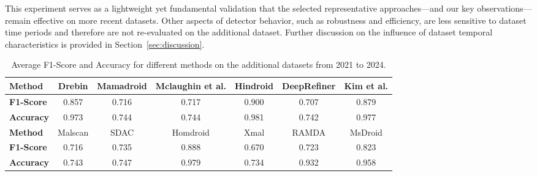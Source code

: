 This experiment serves as a lightweight yet fundamental validation that the selected representative approaches—and our key observations—remain effective on more recent datasets.
Other aspects of detector behavior, such as robustness and efficiency, are less sensitive to dataset time periods and therefore are not re-evaluated on the additional dataset.
Further discussion on the influence of dataset temporal characteristics is provided in Section~\ref{sec:discussion}.


\begin{table}[t]
\centering
\caption{Average F1-Score and Accuracy for different methods on the additional datasets from 2021 to 2024.}
\begin{adjustbox}{width=0.8\linewidth}
\begin{tabular}{lcccccc}
	\toprule
	\textbf{Method} & Drebin & Mamadroid & Mclaughin et al. & Hindroid & DeepRefiner & Kim et al. \\
\midrule
	\textbf{F1-Score} & 0.857 & 0.716 & 0.717 & 0.900 & 0.707 & 0.879 \\
	\textbf{Accuracy} & 0.973 & 0.744 & 0.744 & 0.981 & 0.742 & 0.977 \\
\midrule
\midrule
	\textbf{Method} & Malscan & SDAC & Homdroid & Xmal & RAMDA & MsDroid \\
\midrule
	\textbf{F1-Score} & 0.716 & 0.735 & 0.888 & 0.670 & 0.723 & 0.823 \\
	\textbf{Accuracy} & 0.743 & 0.747 & 0.979 & 0.734 & 0.932 & 0.958 \\
\bottomrule
\end{tabular}
\end{adjustbox}
\label{tab:2021_2024_results}
\vspace{-0.3cm}
\end{table}



